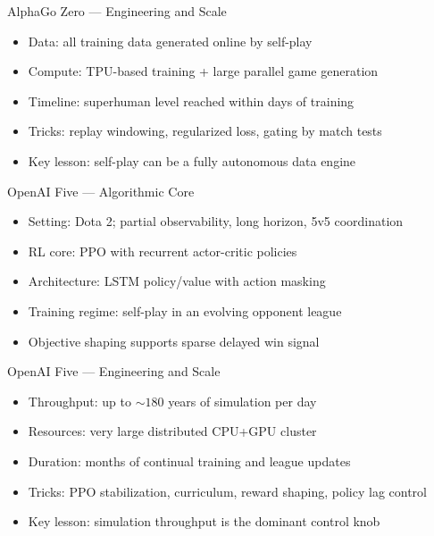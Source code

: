 \documentclass[aspectratio=169]{beamer}
\begin{document}
\begin{frame}{AlphaGo Zero --- Engineering and Scale}
\begin{itemize}
  \item Data: all training data generated online by self-play
  \item Compute: TPU-based training + large parallel game generation
  \item Timeline: superhuman level reached within days of training
  \item Tricks: replay windowing, regularized loss, gating by match tests
  \item Key lesson: self-play can be a fully autonomous data engine
\end{itemize}
\end{frame}

\begin{frame}{OpenAI Five --- Algorithmic Core}
\begin{itemize}
  \item Setting: Dota 2; partial observability, long horizon, 5v5 coordination
  \item RL core: PPO with recurrent actor-critic policies
  \item Architecture: LSTM policy/value with action masking
  \item Training regime: self-play in an evolving opponent league
  \item Objective shaping supports sparse delayed win signal
\end{itemize}
\end{frame}

\begin{frame}{OpenAI Five --- Engineering and Scale}
\begin{itemize}
  \item Throughput: up to $\sim 180$ years of simulation per day
  \item Resources: very large distributed CPU+GPU cluster
  \item Duration: months of continual training and league updates
  \item Tricks: PPO stabilization, curriculum, reward shaping, policy lag control
  \item Key lesson: simulation throughput is the dominant control knob
\end{itemize}
\end{frame}
\end{document}
